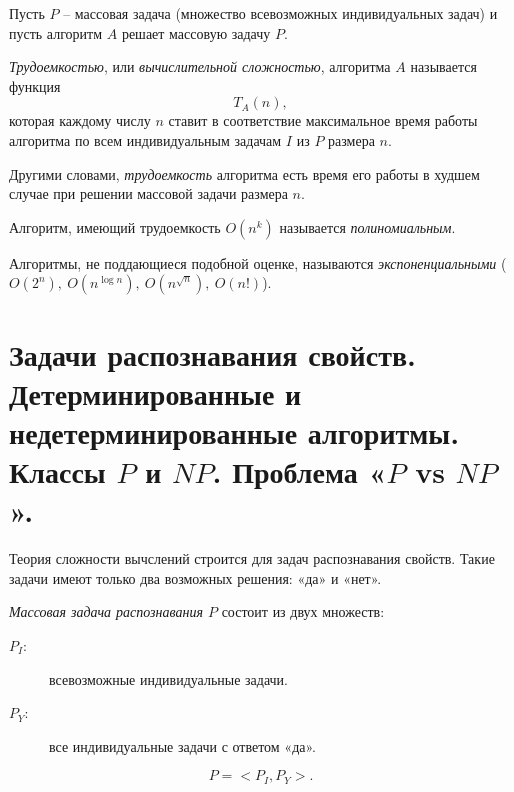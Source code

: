 \begin{note}
    Пусть $ P $ -- массовая задача (множество всевозможных индивидуальных задач) и пусть алгоритм $ A $ решает массовую задачу $ P $.
\end{note}

\begin{definition}
    \emph{Трудоемкостью}, или \emph{вычислительной сложностью}, алгоритма $ A $ называется функция
    \[
        T_A(n),
    \]
    которая каждому числу $ n $ ставит в соответствие максимальное время работы алгоритма по всем индивидуальным задачам $ I $ из $ P $ размера $ n $.

    Другими словами, \emph{трудоемкость} алгоритма есть время его работы в худшем случае при решении массовой задачи размера $ n $.
\end{definition}

\begin{definition}
    Алгоритм, имеющий трудоемкость $ O(n^k) $ называется \emph{полиномиальным}.

    Алгоритмы, не поддающиеся подобной оценке, называются \emph{экспоненциальными} ($ O(2^n), \ O(n^{\log n}), \ O(n^{\sqrt{n}}), \ O(n!) $).
\end{definition}

\section{Задачи распознавания свойств. Детерминированные и недетерминированные алгоритмы. Классы $P$ и $NP$. Проблема «$P$ vs $NP$».}

\begin{note}
    Теория сложности вычслений строится для задач распознавания свойств. Такие задачи имеют только два возможных решения: «да» и «нет».
\end{note}

\begin{definition}
    \emph{Массовая задача распознавания $ P $} состоит из двух множеств:
    \begin{description}
        \item[$ P_I :$] всевозможные индивидуальные задачи.
        \item[$ P_Y :$] все индивидуальные задачи с ответом «да».
    \end{description}
    \[
        P = <P_I, P_Y>.
    \]
\end{definition}

